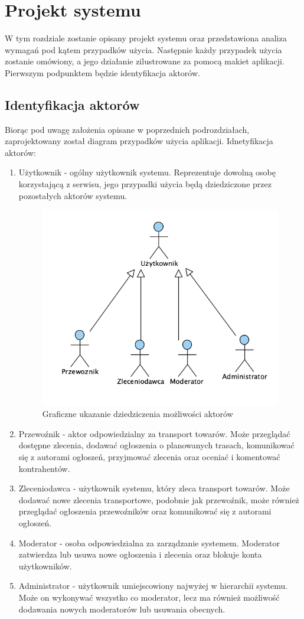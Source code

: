\chapter{Projekt systemu}
W tym rozdziale zostanie opisany projekt systemu oraz przedstawiona analiza wymagań pod kątem przypadków użycia. Następnie każdy przypadek użycia zostanie omówiony, a jego działanie zilustrowane za pomocą makiet aplikacji. Pierwszym podpunktem będzie identyfikacja aktorów.

\section{Identyfikacja aktorów}
Biorąc pod uwagę założenia opisane w poprzednich podrozdziałach, zaprojektowany został diagram przypadków użycia aplikacji. Idnetyfikacja aktorów:
\begin{enumerate}
\item Użytkownik - ogólny użytkownik systemu. Reprezentuje dowolną osobę korzystającą z serwisu, jego przypadki użycia będą dziedziczone przez pozostałych aktorów systemu.
\begin{figure}[H]
	\centering
		\includegraphics[width=0.6\linewidth]{rozdzial1/dziedziczenie.png}
	\caption{Graficzne ukazanie dziedziczenia możliwości aktorów}
	\label{Rys. fig:Graficzne ukazanie dziedziczenia możliwości aktorów}
\end{figure}
\item Przewoźnik - aktor odpowiedzialny za transport towarów. Może przeglądać dostępne zlecenia, dodawać ogłoszenia o planowanych trasach, komunikować się z autorami ogłoszeń, przyjmować zlecenia oraz oceniać i komentować kontrahentów.
\item Zleceniodawca - użytkownik systemu, który zleca transport towarów. Może dodawać nowe zlecenia transportowe, podobnie jak przewoźnik, może również przeglądać ogłoszenia przewoźników oraz komunikować się z autorami ogłoszeń.
\item Moderator - osoba odpowiedzialna za zarządzanie systemem. Moderator zatwierdza lub usuwa nowe ogłoszenia i zlecenia oraz blokuje konta użytkowników.
\item Administrator - użytkownik umiejscowiony najwyżej w hierarchii systemu. Może on wykonywać wszystko co moderator, lecz ma również możliwość dodawania nowych moderatorów lub usuwania obecnych.
\end{enumerate}

